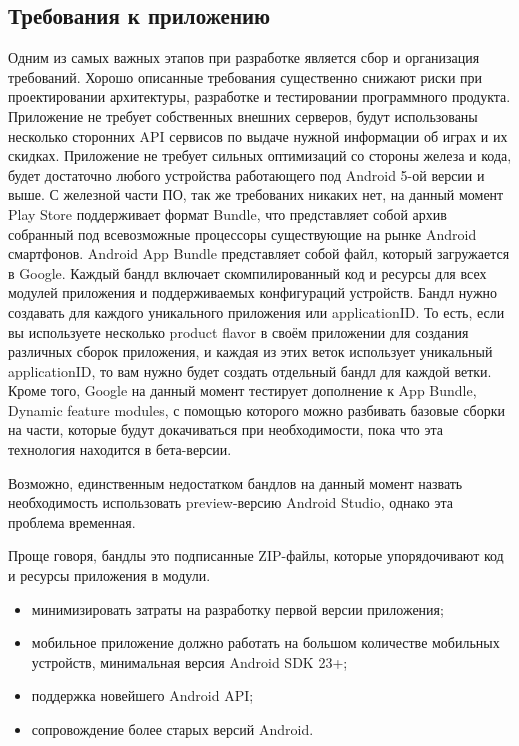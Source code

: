 \subsection{Требования к приложению}
Одним из самых важных этапов при разработке является сбор и организация требований. Хорошо описанные требования существенно снижают риски при проектировании архитектуры, разработке и тестировании программного продукта. Приложение не требует собственных внешних серверов, будут использованы несколько сторонних API сервисов по выдаче нужной информации об играх и их скидках. Приложение не требует сильных оптимизаций со стороны железа и кода, будет достаточно любого устройства работающего под Android 5-ой версии и выше. С железной части ПО, так же требованих никаких нет, на данный момент Play Store поддерживает формат Bundle, что представляет собой архив собранный под всевозможные процессоры существующие на рынке Android смартфонов. Android App Bundle представляет собой файл, который загружается в Google. Каждый бандл включает скомпилированный код и ресурсы для всех модулей приложения и поддерживаемых конфигураций устройств. Бандл нужно создавать для каждого уникального приложения или applicationID. То есть, если вы используете несколько product flavor в своём приложении для создания различных сборок приложения, и каждая из этих веток использует уникальный applicationID, то вам нужно будет создать отдельный бандл для каждой ветки. Кроме того, Google на данный момент тестирует дополнение к App Bundle, Dynamic feature modules, с помощью которого можно разбивать базовые сборки на части, которые будут докачиваться при необходимости, пока что эта технология находится в бета-версии.

Возможно, единственным недостатком бандлов на данный момент назвать необходимость использовать preview-версию Android Studio, однако эта проблема временная.

Проще говоря, бандлы это подписанные ZIP-файлы, которые упорядочивают код и ресурсы приложения в модули.
 
\begin{itemize}
 \item минимизировать затраты на разработку первой версии приложения;
 \item мобильное приложение должно работать на большом количестве мобильных устройств, минимальная версия Android SDK 23+;
 \item поддержка новейшего Android API;
 \item сопровождение более старых версий Android.
\end{itemize}
 
